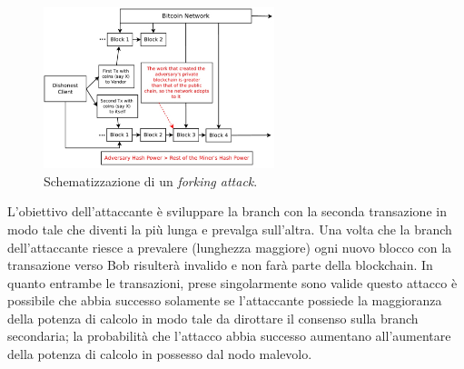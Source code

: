 \begin{figure}
    \centering
    \includegraphics[width=0.6\textwidth]{images/forkingattack.png}
    \caption{Schematizzazione di un \textit{forking attack}.}
\end{figure}
L'obiettivo dell'attaccante è sviluppare la branch con la seconda transazione in modo tale che diventi la più lunga e prevalga sull'altra. Una volta che la branch dell'attaccante riesce a prevalere (lunghezza maggiore) ogni nuovo blocco con la transazione verso Bob risulterà invalido e non farà parte della blockchain.\newline
In quanto entrambe le transazioni, prese singolarmente sono valide questo attacco è possibile che abbia successo solamente se l'attaccante possiede la maggioranza della potenza di calcolo in modo tale da dirottare il consenso sulla branch secondaria; la probabilità che l'attacco abbia successo aumentano all'aumentare della potenza di calcolo in possesso dal nodo malevolo.

